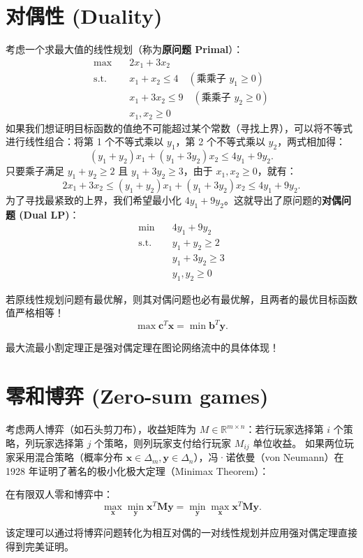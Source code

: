 \section{对偶性 (Duality)}

考虑一个求最大值的线性规划（称为\textbf{原问题 Primal}）：
\begin{align*}
\max \quad & 2x_1 + 3x_2 \\
\text{s.t.} \quad & x_1 + x_2 \le 4 \quad (\text{乘乘子 } y_1 \ge 0) \\
& x_1 + 3x_2 \le 9 \quad (\text{乘乘子 } y_2 \ge 0) \\
& x_1, x_2 \ge 0
\end{align*}
如果我们想证明目标函数的值绝不可能超过某个常数（寻找上界），可以将不等式进行线性组合：将第 1 个不等式乘以 $y_1$，第 2 个不等式乘以 $y_2$，两式相加得：
\[
(y_1 + y_2)x_1 + (y_1 + 3y_2)x_2 \le 4y_1 + 9y_2.
\]
只要乘子满足 $y_1 + y_2 \ge 2$ 且 $y_1 + 3y_2 \ge 3$，由于 $x_1, x_2 \ge 0$，就有：
\[
2x_1 + 3x_2 \le (y_1 + y_2)x_1 + (y_1 + 3y_2)x_2 \le 4y_1 + 9y_2.
\]
为了寻找最紧致的上界，我们希望最小化 $4y_1 + 9y_2$。这就导出了原问题的\textbf{对偶问题 (Dual LP)}：
\begin{align*}
\min \quad & 4y_1 + 9y_2 \\
\text{s.t.} \quad & y_1 + y_2 \ge 2 \\
& y_1 + 3y_2 \ge 3 \\
& y_1, y_2 \ge 0
\end{align*}

\begin{theorem}
若原线性规划问题有最优解，则其对偶问题也必有最优解，且两者的最优目标函数值严格相等！
\[
\max \bm{c}^T \bm{x} = \min \bm{b}^T \bm{y}.
\]
\end{theorem}
最大流最小割定理正是强对偶定理在图论网络流中的具体体现！

\section{零和博弈 (Zero-sum games)}

考虑两人博弈（如石头剪刀布），收益矩阵为 $M \in \mathbb{R}^{m \times n}$：若行玩家选择第 $i$ 个策略，列玩家选择第 $j$ 个策略，则列玩家支付给行玩家 $M_{ij}$ 单位收益。
如果两位玩家采用混合策略（概率分布 $\bm{x} \in \Delta_m, \bm{y} \in \Delta_n$），冯·诺依曼（von Neumann）在 1928 年证明了著名的极小化极大定理（Minimax Theorem）：

\begin{theorem}
在有限双人零和博弈中：
\[
\max_{\bm{x}} \min_{\bm{y}} \bm{x}^T \bm{M} \bm{y} = \min_{\bm{y}} \max_{\bm{x}} \bm{x}^T \bm{M} \bm{y}.
\]
\end{theorem}
该定理可以通过将博弈问题转化为相互对偶的一对线性规划并应用强对偶定理直接得到完美证明。

